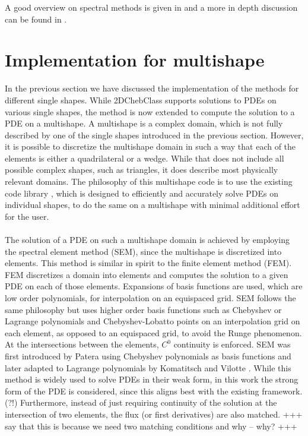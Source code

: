 \documentclass[11pt, a4paper]{article}
\theoremstyle{definition}
\begin{document}
A good overview on spectral methods is given in \cite{bibTrefethen} and a more in depth discussion can be found in \cite{Boyd1}.


\section{Implementation for multishape}
In the previous section we have discussed the implementation of the methods for different single shapes. While 2DChebClass supports solutions to PDEs on various single shapes, the method is now extended to compute the solution to a PDE on a multishape. A multishape is a complex domain, which is not fully described by one of the single shapes introduced in the previous section. However, it is possible to discretize the multishape domain in such a way that each of the elements is either a quadrilateral or a wedge. While that does not include all possible complex shapes, such as triangles, it does describe most physically relevant domains. The philosophy of this multishape code is to use the existing code library \cite{GoddardPseudospectralCode1}, which is designed to efficiently and accurately solve PDEs on individual shapes, to do the same on a multishape with minimal additional effort for the user.
\\
\\
The solution of a PDE on such a multishape domain is achieved by employing the spectral element method (SEM), since the multishape is discretized into elements. This method is similar in spirit to the finite element method (FEM). FEM discretizes a domain into elements and computes the solution to a given PDE on each of those elements. Expansions of basis functions are used, which are low order polynomials, for interpolation on an equispaced grid. SEM follows the same philosophy but uses higher order basis functions such as Chebyshev or Lagrange polynomials and Chebyshev-Lobatto points on an interpolation grid on each element, as opposed to an equispaced grid, to avoid the Runge phenomenon. At the intersections between the elements, $C^0$ continuity is enforced. SEM was first introduced by Patera \cite{SEMPatera84} using  Chebyshev polynomials as basis functions and later adapted to Lagrange polynomials by Komatitsch and Vilotte \cite{SEMLagrange98}.
While this method is widely used to solve PDEs in their weak form, in this work the strong form of the PDE is considered, since this aligns best with the existing framework. (?!) Furthermore, instead of just requiring continuity of the solution at the intersection of two elements, the flux (or first derivatives) are also matched. 
+++ say that this is because we need two matching conditions and why -- why? +++
\\
\\
\end{document}
